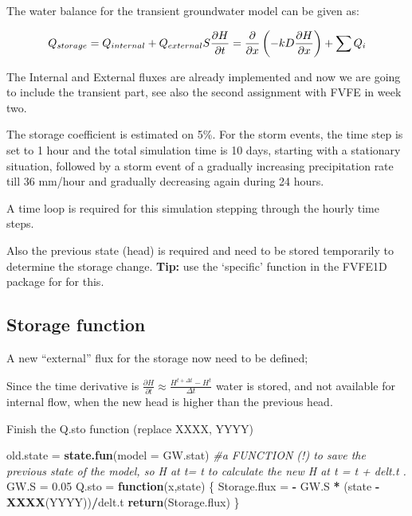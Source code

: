 \documentclass[
]{article}
\newenvironment{Shaded}{\begin{snugshade}}{\end{snugshade}}
\newcommand{\AttributeTok}[1]{\textcolor[rgb]{0.13,0.29,0.53}{#1}}
\newcommand{\CommentTok}[1]{\textcolor[rgb]{0.56,0.35,0.01}{\textit{#1}}}
\newcommand{\ControlFlowTok}[1]{\textcolor[rgb]{0.13,0.29,0.53}{\textbf{#1}}}
\newcommand{\FloatTok}[1]{\textcolor[rgb]{0.00,0.00,0.81}{#1}}
\newcommand{\FunctionTok}[1]{\textcolor[rgb]{0.13,0.29,0.53}{\textbf{#1}}}
\newcommand{\NormalTok}[1]{#1}
\newcommand{\OtherTok}[1]{\textcolor[rgb]{0.56,0.35,0.01}{#1}}
\newcommand{\SpecialCharTok}[1]{\textcolor[rgb]{0.81,0.36,0.00}{\textbf{#1}}}
\begin{document}
The water balance for the transient groundwater model can be given as:

\[
Q_{storage}= Q_{internal} + Q_{external}\\
 S \frac{\partial H}{\partial t} = \frac {\partial}{\partial x}\left ( -kD \frac{\partial H}{\partial x} \right ) + \sum Q_i
\]

The Internal and External fluxes are already implemented and now we are
going to include the transient part, see also the second assignment with
FVFE in week two.

The storage coefficient is estimated on 5\%. For the storm events, the
time step is set to 1 hour and the total simulation time is 10 days,
starting with a stationary situation, followed by a storm event of a
gradually increasing precipitation rate till 36 mm/hour and gradually
decreasing again during 24 hours.

A time loop is required for this simulation stepping through the hourly
time steps.

Also the previous state (head) is required and need to be stored
temporarily to determine the storage change. \textbf{Tip:} use the
`specific' function in the FVFE1D package for for this.

\hypertarget{storage-function}{%
\subsection{Storage function}\label{storage-function}}

A new ``external'' flux for the storage now need to be defined;

Since the time derivative is
\(\frac{\partial H}{\partial t} \approx \frac {H^{t+\Delta t}-H^t}{\Delta t}\)
water is stored, and not available for internal flow, when the new head
is higher than the previous head.

Finish the Q.sto function (replace XXXX, YYYY)

\begin{Shaded}
\begin{Highlighting}[]
\NormalTok{old.state }\OtherTok{=} \FunctionTok{state.fun}\NormalTok{(}\AttributeTok{model =}\NormalTok{ GW.stat) }\CommentTok{\#a FUNCTION (!) to save the previous state of the model, so H at t= t to calculate the new H at t = t + delt.t .}
\NormalTok{GW.S }\OtherTok{=} \FloatTok{0.05}
\NormalTok{Q.sto }\OtherTok{=} \ControlFlowTok{function}\NormalTok{(x,state)}
\NormalTok{\{}
\NormalTok{  Storage.flux }\OtherTok{=} \SpecialCharTok{{-}}\NormalTok{ GW.S }\SpecialCharTok{*}\NormalTok{ (state }\SpecialCharTok{{-}} \FunctionTok{XXXX}\NormalTok{(YYYY))}\SpecialCharTok{/}\NormalTok{delt.t}
  \FunctionTok{return}\NormalTok{(Storage.flux)}
\NormalTok{\}}
\end{Highlighting}
\end{Shaded}
\end{document}
